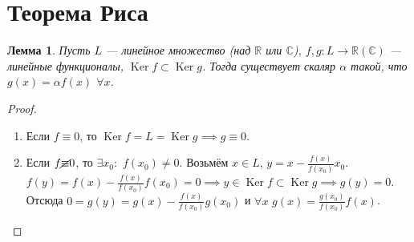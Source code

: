 \documentclass[11pt,openany,a4paper]{scrartcl}
\theoremstyle{plain}
\newtheorem{lemma}[theorem]{Лемма}
\theoremstyle{definition}
\newcommand\mb{\mathbb}
\newcommand\real{\mb R}
\newcommand{\complex}{\mb C}
\DeclareMathOperator{\Ker}{Ker}
\begin{document}
\section{Теорема Риса}

\begin{lemma}
    Пусть $L$ — линейное множество (над $\real$ или $\complex$),
    $f, g: L \to \real(\complex)$ — линейные функционалы, $\Ker f \subset \Ker g$.
    Тогда существует скаляр $\alpha$ такой, что $g(x) = \alpha f(x)$ $\forall x$.
\end{lemma}
\begin{proof}
\mbox{}
    \begin{enumerate}
        \item Если $f\equiv 0$, то $\Ker f = L = \Ker g \implies g \equiv 0$.
        \item Если $f\cancel \equiv 0$, то $\exists x_0:$ $f(x_0) \neq 0$.
        Возьмём $x\in L$, $y = x - \frac{f(x)}{f(x_0)}x_0$.
        $f(y) = f(x) - \frac{f(x)}{f(x_0)}f(x_0) = 0 \implies
        y \in \Ker f\subset \Ker g \implies g(y) = 0$. Отсюда
        $0 = g(y) = g(x) - \frac{f(x)}{f(x_0)}g(x_0)$ и $\forall x$
        $g(x) = \frac{g(x_0)}{f(x_0)}f(x)$.
    \end{enumerate}
\end{proof}
\end{document}
